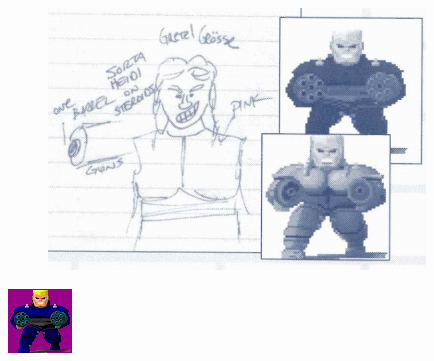 \documentclass[book.tex]{subfiles}
\begin{document}
 
   \begin{figure}[H]
\centering
 \includegraphics[scale=0.8]{imgs/tom_hall_sketch_gretel.png}\\
\end{figure}
      \begin{minipage}{.48\textwidth}
     \includegraphics[width=\textwidth]{imgs/sprites/hans_grosse.png}
  \end{minipage}
\end{document}
